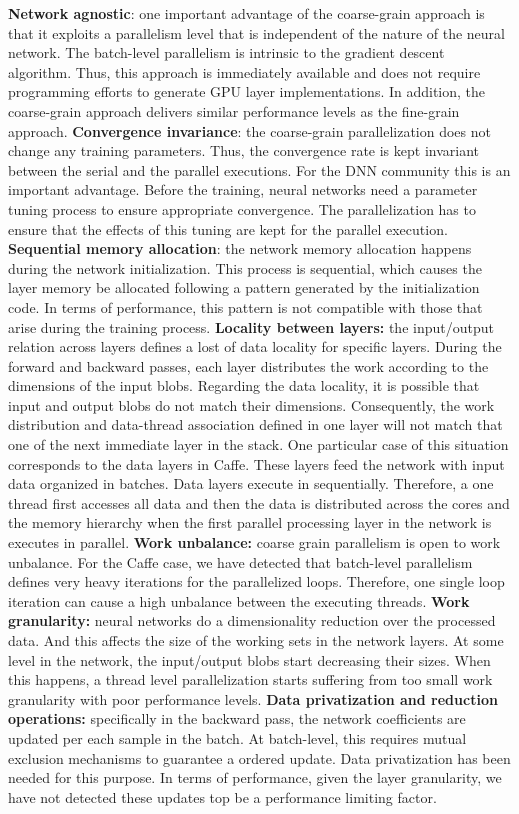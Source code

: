 \textbf{Network agnostic}: one important advantage of the coarse-grain 
approach is that it exploits a parallelism level that is independent of 
the nature of the neural network. The batch-level parallelism is 
intrinsic to the gradient descent algorithm. Thus, this approach is 
immediately available and does not require programming efforts to generate 
GPU layer implementations. In addition, the coarse-grain approach 
delivers similar performance levels as the fine-grain approach. 
\textbf{Convergence invariance}: the coarse-grain parallelization does not 
change any training parameters. Thus, the convergence rate is kept 
invariant between the serial and the parallel executions. 
For the DNN community this is an important advantage. Before 
the training, neural networks need a parameter tuning process to ensure 
appropriate convergence. The parallelization has to ensure that the effects of this tuning are kept for the parallel execution.
\textbf{Sequential memory allocation}: the network memory allocation
happens during the network initialization. This process is sequential, 
which causes the layer memory be allocated following a
pattern generated by the initialization code. In terms of performance, 
this pattern is not compatible with those that arise during
the training process.
\textbf{Locality between layers:} the input/output relation across layers
defines a lost of data locality for specific layers. During the forward 
and backward passes, each layer distributes the work according to the 
dimensions of the input blobs. Regarding the data locality, it is 
possible that input and output blobs do not match
their dimensions. Consequently, the work distribution and data-thread
association defined in one layer will not match that one of the
next immediate layer in the stack.
One particular case of this situation corresponds to the data
layers in Caffe. These layers feed the network with input data
organized in batches. Data layers execute in sequentially.
Therefore, a one thread first accesses all data and then the data is
distributed across the cores and the memory hierarchy when the
first parallel processing layer in the network is executes in parallel. 
\textbf{Work unbalance:} coarse grain parallelism is open to work unbalance. 
For the Caffe case, we have detected that batch-level parallelism 
defines very heavy iterations for the parallelized loops.
Therefore, one single loop iteration can cause a high unbalance
between the executing threads. 
\textbf{Work granularity:} neural networks do
a dimensionality reduction over the processed data.
And this affects the size of the working sets in the network layers.
At some level in the network, the input/output blobs start decreasing their sizes. When this happens, a thread level parallelization
starts suffering from too small work granularity with poor performance levels.
\textbf{Data privatization and reduction operations:} specifically in the
backward pass, the network coefficients are updated per each
sample in the batch. At batch-level, this requires mutual exclusion
mechanisms to guarantee a ordered update. Data privatization has
been needed for this purpose. In terms of performance, given the 
layer granularity, we have not detected these updates top be a 
performance limiting factor.


